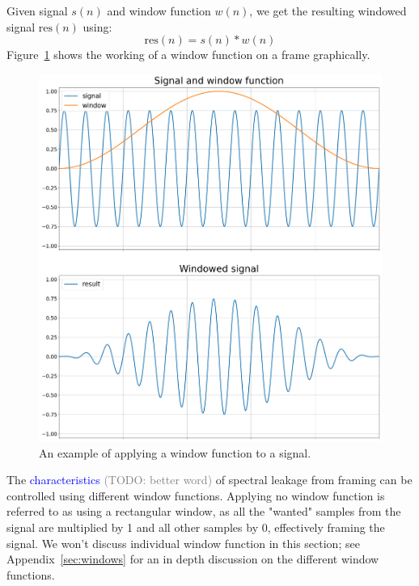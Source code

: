 \documentclass[a4paper,10pt,twocolumn]{article}
\begin{document}
Given signal $s(n)$ and window function $w(n)$, we get the resulting windowed signal $\text{res}(n)$ using:
\[ \text{res}(n) = s(n) * w(n) \]
Figure~\ref{fig:windowfunc} shows the working of a window function on a frame graphically.
\begin{figure}[h]
    \centering
    \includegraphics[width=\linewidth]{fig/window.png}
    \caption{An example of applying a window function to a signal.}
    \label{fig:windowfunc}
\end{figure}

The \textcolor{blue}{characteristics} \textcolor{gray}{(TODO: better word)} of spectral leakage from framing can be controlled using different window functions.
Applying no window function is referred to as using a rectangular window, as all the "wanted" samples from the signal are multiplied by 1 and all other samples by 0, effectively framing the signal. We won't discuss individual window function in this section; see Appendix~\ref{sec:windows} for an in depth discussion on the different window functions.
\end{document}
